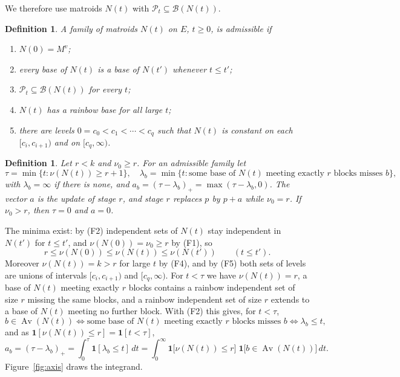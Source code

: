 \documentclass[11pt]{article}
\newtheorem{definition}[theorem]{Definition}
\newcommand{\Bases}{\mathcal B}
\newcommand{\Pos}{\mathcal P}
\newcommand{\Av}{\operatorname{Av}}
\begin{document}
We therefore use matroids $N(t)$ with $\Pos_t\subseteq\Bases(N(t))$.

\begin{definition}
\label{def:admissible}
A family of matroids $N(t)$ on $E$, $t\ge0$, is \emph{admissible} if
\begin{enumerate}
  \item[(F1)] $N(0)=M^{v}$;
  \item[(F2)] every base of $N(t)$ is a base of $N(t')$ whenever $t\le t'$;
  \item[(F3)] $\Pos_t\subseteq\Bases(N(t))$ for every $t$;
  \item[(F4)] $N(t)$ has a rainbow base for all large $t$;
  \item[(F5)] there are levels $0=c_0<c_1<\cdots<c_q$ such that $N(t)$ is
        constant on each $[c_i,c_{i+1})$ and on $[c_q,\infty)$.
\end{enumerate}
\end{definition}

\begin{definition}
\label{def:update}
Let $r<k$ and $\nu_0\ge r$.  For an admissible family let
\[
  \tau=\min\{t:\nu(N(t))\ge r+1\},\quad
  \lambda_b=\min\{t:\text{some base of }N(t)\text{ meeting exactly }r\text{ blocks misses }b\},
\]
with $\lambda_b=\infty$ if there is none, and $a_b=(\tau-\lambda_b)_+=\max(\tau-\lambda_b,0)$.  The
vector $a$ is the update of stage $r$, and stage $r$ replaces $p$ by $p+a$ while
$\nu_0=r$.  If $\nu_0>r$, then $\tau=0$ and $a=0$.
\end{definition}

The minima exist: by (F2) independent sets of $N(t)$ stay independent in $N(t')$
for $t\le t'$, and $\nu(N(0))=\nu_0\ge r$ by (F1), so
\[
  r\le\nu(N(0))\le\nu(N(t))\le\nu(N(t'))\qquad(t\le t').
\]
Moreover $\nu(N(t))=k>r$ for large $t$ by (F4), and by (F5) both sets of levels are
unions of intervals $[c_i,c_{i+1})$ and $[c_q,\infty)$.  For $t<\tau$ we have
$\nu(N(t))=r$, a base of $N(t)$ meeting exactly $r$ blocks contains a rainbow
independent set of size $r$ missing the same blocks, and a rainbow independent
set of size $r$ extends to a base of $N(t)$ meeting no further block.  With (F2)
this gives, for $t<\tau$,
\[
  b\in\Av(N(t))\iff\text{some base of }N(t)\text{ meeting exactly }r\text{ blocks misses }b
  \iff\lambda_b\le t,
\]
and as $\mathbf 1[\nu(N(t))\le r]=\mathbf 1[t<\tau]$,
\begin{equation}
  a_b=(\tau-\lambda_b)_+=\int_0^{\tau}\mathbf 1[\lambda_b\le t]\,dt
  =\int_0^{\infty}\mathbf 1\bigl[\nu(N(t))\le r\bigr]\;\mathbf 1\bigl[b\in\Av(N(t))\bigr]\,dt.
  \label{eq:update-integral}
\end{equation}
Figure~\ref{fig:axis} draws the integrand.
\end{document}
